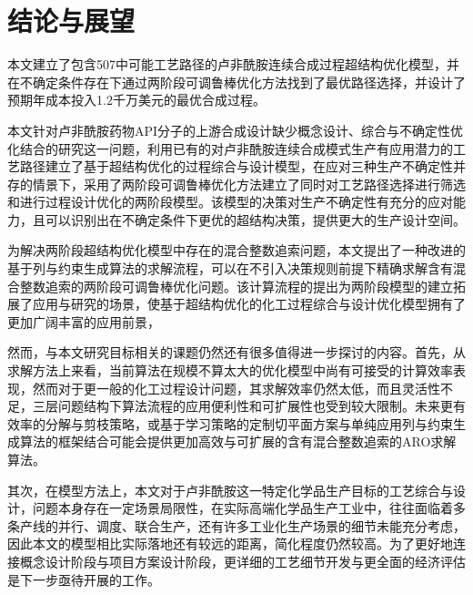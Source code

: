 
\chapter{结论与展望}

本文建立了包含507中可能工艺路径的卢非酰胺连续合成过程超结构优化模型，并在不确定条件存在下通过两阶段可调鲁棒优化方法找到了最优路径选择，并设计了预期年成本投入1.2千万美元的最优合成过程。

本文针对卢非酰胺药物API分子的上游合成设计缺少概念设计、综合与不确定性优化结合的研究这一问题，利用已有的对卢非酰胺连续合成模式生产有应用潜力的工艺路径建立了基于超结构优化的过程综合与设计模型，在应对三种生产不确定性并存的情景下，采用了两阶段可调鲁棒优化方法建立了同时对工艺路径选择进行筛选和进行过程设计优化的两阶段模型。该模型的决策对生产不确定性有充分的应对能力，且可以识别出在不确定条件下更优的超结构决策，提供更大的生产设计空间。

为解决两阶段超结构优化模型中存在的混合整数追索问题，本文提出了一种改进的基于列与约束生成算法的求解流程，可以在不引入决策规则前提下精确求解含有混合整数追索的两阶段可调鲁棒优化问题。该计算流程的提出为两阶段模型的建立拓展了应用与研究的场景，使基于超结构优化的化工过程综合与设计优化模型拥有了更加广阔丰富的应用前景，

然而，与本文研究目标相关的课题仍然还有很多值得进一步探讨的内容。首先，从求解方法上来看，当前算法在规模不算太大的优化模型中尚有可接受的计算效率表现，然而对于更一般的化工过程设计问题，其求解效率仍然太低，而且灵活性不足，三层问题结构下算法流程的应用便利性和可扩展性也受到较大限制。未来更有效率的分解与剪枝策略，或基于学习策略的定制切平面方案与单纯应用列与约束生成算法的框架结合可能会提供更加高效与可扩展的含有混合整数追索的ARO求解算法。

其次，在模型方法上，本文对于卢非酰胺这一特定化学品生产目标的工艺综合与设计，问题本身存在一定场景局限性，在实际高端化学品生产工业中，往往面临着多条产线的并行、调度、联合生产，还有许多工业化生产场景的细节未能充分考虑，因此本文的模型相比实际落地还有较远的距离，简化程度仍然较高。为了更好地连接概念设计阶段与项目方案设计阶段，更详细的工艺细节开发与更全面的经济评估是下一步亟待开展的工作。










